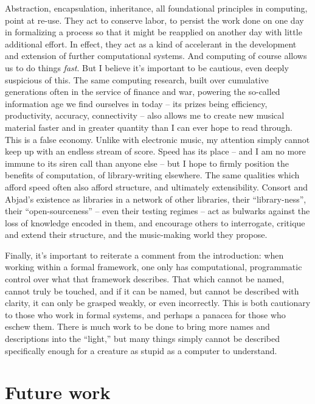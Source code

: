 Abstraction, encapsulation, inheritance, all foundational principles in
computing, point at re-use. They act to conserve labor, to persist the work
done on one day in formalizing a process so that it might be reapplied on
another day with little additional effort. In effect, they act as a kind of
accelerant in the development and extension of further computational systems.
And computing of course allows us to do things \emph{fast}. But I believe it's
important to be cautious, even deeply suspicious of this. The same computing
research, built over cumulative generations often in the service of finance and
war, powering the so-called information age we find ourselves in today -- its
prizes being efficiency, productivity, accuracy, connectivity -- also allows me
to create new musical material faster and in greater quantity than I can ever
hope to read through. This is a false economy. Unlike with electronic music, my
attention simply cannot keep up with an endless stream of score. Speed has its
place -- and I am no more immune to its siren call than anyone else -- but I
hope to firmly position the benefits of computation, of library-writing
elsewhere. The same qualities which afford speed often also afford structure,
and ultimately extensibility. Consort and Abjad's existence as libraries in a
network of other libraries, their \enquote{library-ness}, their
\enquote{open-sourceness} -- even their testing regimes -- act as bulwarks
against the loss of knowledge encoded in them, and encourage others to
interrogate, critique and extend their structure, and the music-making world
they propose.

Finally, it's important to reiterate a comment from the introduction: when
working within a formal framework, one only has computational, programmatic
control over what that framework describes. That which cannot be named, cannot
truly be touched, and if it can be named, but cannot be described with
clarity, it can only be grasped weakly, or even incorrectly. This is both
cautionary to those who work in formal systems, and perhaps a panacea for those
who eschew them. There is much work to be done to bring more names and
descriptions into the \enquote{light,} but many things simply cannot be
described specifically enough for a creature as stupid as a computer to
understand.

\section{Future work}
\label{sec:future-work}

